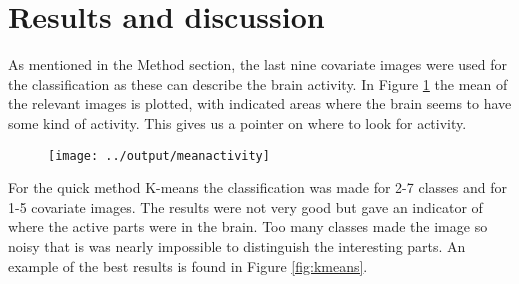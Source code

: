 \documentclass[a4paper,english]{article}
\begin{document}
\section{Results and discussion}

As mentioned in the Method section, the last nine covariate images were used for the classification as these can describe the brain activity. In Figure \ref{fig:mean} the mean of the relevant images is plotted, with indicated areas where the brain seems to have some kind of activity. This gives us a pointer on where to look for activity.

\begin{figure}[H]
	\centering
    \texttt{[image: ../output/meanactivity]}
    \caption{}
    \label{fig:mean}
\end{figure}



For the quick method K-means the classification was made for 2-7 classes and for 1-5 covariate images. The results were not very good but gave an indicator of where the active parts were in the brain. Too many classes made the image so noisy that is was nearly impossible to distinguish the interesting parts. An example of the best results is found in Figure \ref{fig:kmeans}.
\end{document}
